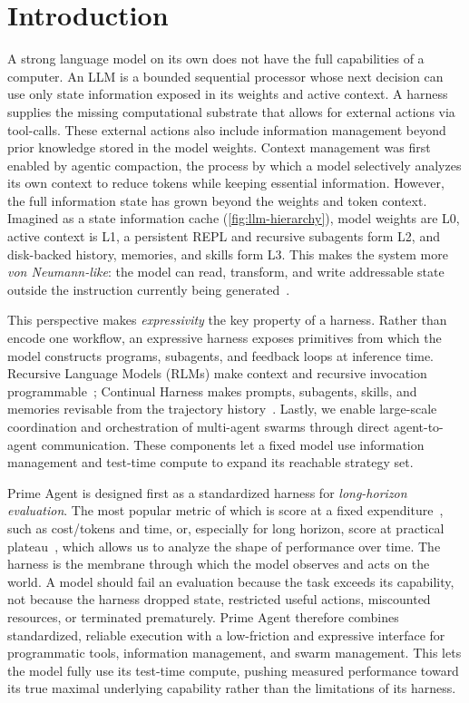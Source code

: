 \section{Introduction}
A strong language model on its own does not have the full capabilities of a computer.
An LLM is a bounded sequential processor whose next decision can use only state information exposed in its weights and active context.
A harness supplies the missing computational substrate that allows for external actions via tool-calls.
These external actions also include information management beyond prior knowledge stored in the model weights. Context management was first enabled by agentic compaction, the process by which a model selectively analyzes its own context to reduce tokens while keeping essential information.
However, the full information state has grown beyond the weights and token context.
Imagined as a state information cache (\cref{fig:llm-hierarchy}), model weights are L0, active context is L1, a persistent REPL and recursive subagents form L2, and disk-backed history, memories, and skills form L3.
This makes the system more \emph{von Neumann-like}: the model can read, transform, and write addressable state outside the instruction currently being generated~\citep{turing1936computable,vonneumann1945edvac}.

This perspective makes \emph{expressivity} the key property of a harness.
Rather than encode one workflow, an expressive harness exposes primitives from which the model constructs programs, subagents, and feedback loops at inference time.
Recursive Language Models (RLMs) make context and recursive invocation programmable~\citep{zhang2025recursivelanguagemodels}; Continual Harness makes prompts, subagents, skills, and memories revisable from the trajectory history~\citep{karten2026continualharness}.
Lastly, we enable large-scale coordination and orchestration of multi-agent swarms through direct agent-to-agent communication.
These components let a fixed model use information management and test-time compute to expand its reachable strategy set.

Prime Agent is designed first as a standardized harness for \emph{long-horizon evaluation}.
The most popular metric of which is score at a fixed expenditure~\citep{metr2026}, such as cost/tokens and time, or, especially for long horizon, score at practical plateau~\citep{metr2026}, which allows us to analyze the shape of performance over time.
The harness is the membrane through which the model observes and acts on the world.
A model should fail an evaluation because the task exceeds its capability, not because the harness dropped state, restricted useful actions, miscounted resources, or terminated prematurely.
Prime Agent therefore combines standardized, reliable execution with a low-friction and expressive interface for programmatic tools, information management, and swarm management.
This lets the model fully use its test-time compute, pushing measured performance toward its true maximal underlying capability rather than the limitations of its harness.


